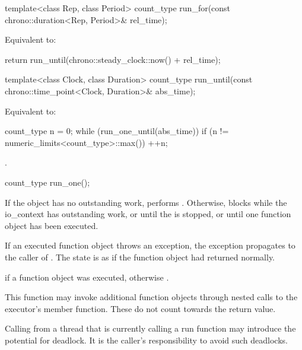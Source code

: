 %
\begin{itemdecl}
template<class Rep, class Period>
  count_type run_for(const chrono::duration<Rep, Period>& rel_time);
\end{itemdecl}

\begin{itemdescr}
\pnum
\effects Equivalent to:
\begin{codeblock}
return run_until(chrono::steady_clock::now() + rel_time);
\end{codeblock}

\end{itemdescr}

%
\begin{itemdecl}
template<class Clock, class Duration>
  count_type run_until(const chrono::time_point<Clock, Duration>& abs_time);
\end{itemdecl}

\begin{itemdescr}
\pnum
\effects Equivalent to:
\begin{codeblock}
count_type n = 0;
while (run_one_until(abs_time))
  if (n != numeric_limits<count_type>::max())
    ++n;
\end{codeblock}


\pnum
\returns {}.
\end{itemdescr}

%
\begin{itemdecl}
count_type run_one();
\end{itemdecl}

\begin{itemdescr}
\pnum
\effects If the  object has no outstanding work, performs . Otherwise, blocks while the io_context has outstanding work, or until the  is stopped, or until one function object has been executed.

\pnum
If an executed function object throws an exception, the exception propagates to the caller of . The  state is as if the function object had returned normally.

\pnum
\returns {} if a function object was executed, otherwise .

\pnum
\remarks This function may invoke additional function objects through nested calls to the  executor's  member function. These do not count towards the return value.

\pnum
\begin{note}
Calling  from a thread that is currently calling a run function
may introduce the potential for deadlock.
It is the caller's responsibility to avoid such deadlocks.
\end{note}
\end{itemdescr}

